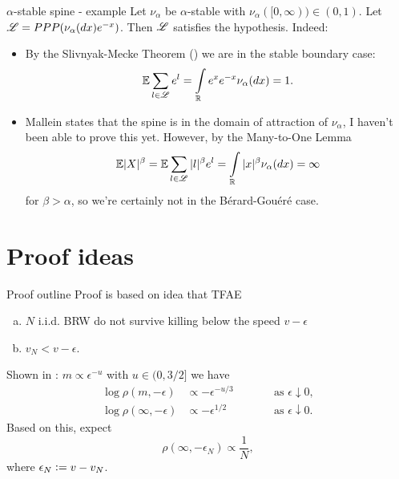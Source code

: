 \documentclass{beamer}
\begin{document}
\begin{frame}{$\alpha$-stable spine - example}
Let $\nu_\alpha$ be $\alpha$-stable with $\nu_\alpha([0, \infty)) \in (0, 1)$. Let $\mathscr{L} = PPP(\nu_\alpha(dx) e^{-x})$. Then $\mathscr{L}$ satisfies the hypothesis. Indeed:
\begin{itemize}
\item By the Slivnyak-Mecke Theorem (\cite[Theorem 1.13]{baccelli2009stochastic}) we are in the stable boundary case:
\begin{equation}\nonumber
\mathbb{E} \sum\limits_{l \in \mathscr{L}} e^l = \int\limits_{\mathbb{R}} e^{x}e^{-x}\nu_\alpha(dx) = 1. 
\end{equation}
\item Mallein states that the spine is in the domain of attraction of $\nu_\alpha$, I haven't been able to prove this yet. However, by the Many-to-One Lemma
\begin{equation}\nonumber
\mathbb{E} |X|^\beta = \mathbb{E} \sum\limits_{l \in \mathscr{L}} |l|^\beta e^l = \int\limits_{\mathbb{R}} |x|^\beta \nu_\alpha(dx) = \infty
\end{equation}
for $\beta > \alpha$, so we're certainly not in the Bérard-Gouéré case. 
\end{itemize}
\end{frame}







\section{Proof ideas}
\begin{frame}{Proof outline}
Proof is based on idea that TFAE
\begin{enumerate}[(a)]
\item $N$ i.i.d. BRW do not survive killing below the speed $v - \epsilon$
\item $v_N < v - \epsilon$. 
\end{enumerate}
\vspace{3mm}
Shown in \cite{gantert2008asymptotics}: $m \propto \epsilon^{-u}$ with $u \in (0, 3/2]$ we have
\begin{align*}
\log \rho(m, -\epsilon) &\propto - \epsilon^{-u/3}\qquad&&\text{as } \epsilon \downarrow 0, \\
\log\rho(\infty, -\epsilon) &\propto - \epsilon^{1/2}\qquad&&\text{as } \epsilon \downarrow 0.
\end{align*}
\vspace{3mm}
Based on this, expect
\begin{equation}\nonumber
\rho(\infty, - \epsilon_N) \propto \frac{1}{N}, 
\end{equation}
where $\epsilon_N \vcentcolon= v - v_N$. 
\end{frame}
\end{document}
